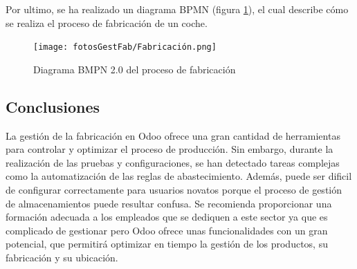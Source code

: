 Por ultimo, se ha realizado un diagrama BPMN (figura \ref{fab}), el cual describe cómo se realiza el proceso de fabricación de un coche.
\begin{figure}[h]
    \centering
    \texttt{[image: fotosGestFab/Fabricación.png]}
    \caption{Diagrama BMPN 2.0 del proceso de fabricación}
    \label{fab}
\end{figure}
\subsection{Conclusiones}
La gestión de la fabricación en Odoo ofrece una gran cantidad de herramientas para controlar y optimizar el proceso de producción. Sin embargo, durante la realización de las pruebas y configuraciones, se han detectado tareas complejas como la automatización de las reglas de abastecimiento. Además, puede ser dificil de configurar correctamente para usuarios novatos porque el proceso de gestión de almacenamientos puede resultar confusa. Se recomienda proporcionar una formación adecuada a los empleados que se dediquen a este sector ya que es complicado de gestionar pero Odoo ofrece unas funcionalidades con un gran potencial, que permitirá optimizar en tiempo la gestión de los productos, su fabricación y su ubicación.